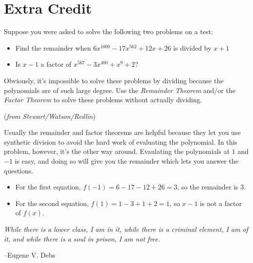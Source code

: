 \documentclass[fleqn,addpoints]{exam}
\begin{document}
\fi

\section{Extra Credit}

\begin{questions}

\question


Suppose you were asked to solve the following two problems on a test:
\begin{itemize}
  \item Find the remainder when $6x^{1000} - 17x^{562} + 12x + 26$ is divided by $x+1$
  \item Is $x-1$ a factor of $x^{567} - 3x^{400} + x^9 + 2$?
\end{itemize}

Obviously, it's impossible to solve these problems by dividing because the polynomials are of such large degree.  Use
the {\em Remainder Theorem} and/or the {\em Factor Theorem} to solve these problems without actually dividing.

({\em from Stewart/Watson/Redlin})

\begin{solution}
Usually the remainder and factor theorems are helpful because they let you use synthetic division to avoid the hard work of
evaluating the polynomial.  In this problem, however, it's the other way around.  Evaulating the polynomials at $1$ and
$-1$ is easy, and doing so will give you the remainder which lets you answer the questions.

\begin{itemize}
  \item For the first equation, $f(-1) = 6 - 17 - 12 + 26 = 3$, so the remainder is $3$.
  \item For the second equation, $f(1) = 1 - 3 + 1 + 2 = 1$, so $x-1$ is not a factor of $f(x)$.
\end{itemize}

\end{solution}

\end{questions}

\ifprintanswers
\else
\vspace{4 cm}

{\em While there is a lower class, I am in it, while there is a criminal element, I am of it, and while there is a soul in prison, I am not free.}

\vspace{.1 cm}
\hspace{1 cm} --Eugene V. Debs

\fi
\end{document}
